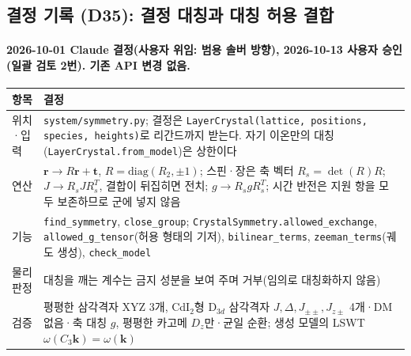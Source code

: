 \subsection{결정 기록 (D35): 결정 대칭과 대칭 허용 결합}\label{decisions-d35-symmetry}
\begingroup%
  \framesubtitle{2026-10-01 Claude 결정(사용자 위임: 범용 솔버 방향), 2026-10-13 사용자 승인(일괄 검토 2번). 기존 API 변경 없음.}
  \small\renewcommand{\arraystretch}{1.12}
  \begin{tabularx}{\textwidth}{@{}P{3.0cm}Y@{}}
    \toprule
    항목 & 결정 \\
    \midrule
    위치·입력 & \texttt{system/symmetry.py}; 결정은 \texttt{LayerCrystal(lattice, positions, species, heights)}로 리간드까지 받는다. 자기 이온만의 대칭(\texttt{LayerCrystal.from\_model})은 상한이다 \\
    연산 & $\mathbf r\to R\mathbf r+\mathbf t$, $R=\mathrm{diag}(R_2,\pm1)$; 스핀·장은 축 벡터 $R_s=\det(R)R$; $J\to R_sJR_s^{T}$, 결합이 뒤집히면 전치; $g\to R_sgR_s^{T}$; 시간 반전은 지원 항을 모두 보존하므로 군에 넣지 않음 \\
    기능 & \texttt{find\_symmetry}, \texttt{close\_group}; \texttt{CrystalSymmetry.allowed\_exchange}, \texttt{allowed\_g\_tensor}(허용 형태의 기저), \texttt{bilinear\_terms}, \texttt{zeeman\_terms}(궤도 생성), \texttt{check\_model} \\
    물리 판정 & 대칭을 깨는 계수는 금지 성분을 보여 주며 거부(임의로 대칭화하지 않음) \\
    검증 & 평평한 삼각격자 XYZ 3개, CdI$_2$형 D$_{3d}$ 삼각격자 $J,\Delta,J_{\pm\pm},J_{z\pm}$ 4개·DM 없음·축 대칭 $g$, 평평한 카고메 $D_z$만·균일 순환; 생성 모델의 LSWT $\omega(C_3\mathbf k)=\omega(\mathbf k)$ \\
    \bottomrule
  \end{tabularx}
\endgroup


